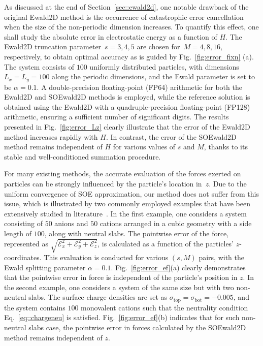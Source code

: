 As discussed at the end of Section~\ref{sec::ewald2d}, one notable drawback of the original Ewald2D method is the occurrence of catastrophic error cancellation when the size of the non-periodic dimension increases. 
To quantify this effect, one shall study the absolute error in electrostatic energy as a function of $H$. 
The Ewald2D truncation parameter~$s= 3, 4, 5$ are chosen for~$M = 4, 8, 16$, respectively, to obtain optimal accuracy as is guided by Fig.~\ref{fig:error_fixn} (a).
The system consists of $100$ uniformly distributed particles, with dimensions $L_x = L_y = 100$ along the periodic dimensions, and the Ewald parameter is set to be $\alpha = 0.1$.
A double-precision floating-point (FP64) arithmetic for both the Ewald2D and SOEwald2D methods is employed, while the reference solution is obtained using the Ewald2D with a quadruple-precision floating-point (FP128) arithmetic, ensuring a sufficient number of significant digits. 
The results presented in Fig.~\ref{fig:error_Lz} clearly illustrate that the error of the Ewald2D method increases rapidly with $H$.
In contrast, the error of the SOEwald2D method remains independent of $H$ for various values of $s$ and $M$, thanks to its stable and well-conditioned summation procedure.

For many existing methods, the accurate evaluation of the forces exerted on particles can be strongly influenced by the particle's location in~$z$. 
Due to the uniform convergence of SOE approximation, our method does not suffer from this issue, which is illustrated by two commonly employed examples that have been extensively studied in literature~\cite{lindbo2012fast,de2002electrostatics}. 
In the first example, one considers a system consisting of $50$ anions and $50$ cations arranged in a cubic geometry with a side length of $100$, along with neutral slabs.  
The pointwise error of the force, represented as $\sqrt{\mathscr{E}_{x}^2+\mathscr{E}_{y}^2+\mathscr{E}_{z}^2}$,  is calculated as a function of the particles' $z$-coordinates. 
This evaluation is conducted for various $(s,M)$ pairs, with the Ewald splitting parameter $\alpha=0.1$. 
Fig.~\ref{fig:error_ef}(a) clearly demonstrates that the pointwise error in force is independent of the particle's position in $z$. 
In the second example, one considers a system of the same size but with two non-neutral slabs. 
The surface charge densities are set as $\sigma_{\mathrm{top}} = \sigma_{\mathrm{bot}} = -0.005$, and the system contains $100$ monovalent cations such that the neutrality condition Eq.~\eqref{eq::chargeneu} is satisfied. 
Fig.~\ref{fig:error_ef}(b) indicates that for such non-neutral slabs case, the pointwise error in forces calculated by the SOEwald2D method remains independent of $z$.

